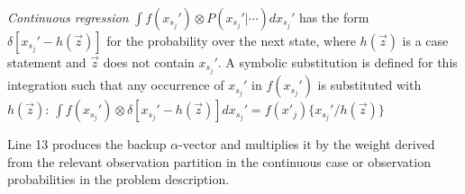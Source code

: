 \documentclass{article} %
\begin{document}
\emph{Continuous regression} $\int f(x_{s_j}') \otimes P(x_{s_j}'|\cdots) dx_{s_j}'$ has the form $\delta[x_{s_j}' - h(\vec{z})]$ for the probability over the next state, where $h(\vec{z})$ is a case statement and $\vec{z}$ does not contain
$x_{s_j}'$.  A symbolic substitution is defined for this integration such that any occurrence of $x_{s_j}'$ in $f(x_{s_j}')$ is substituted with $h(\vec{z})$: 
$\int f(x_{s_j}') \otimes \delta[x_{s_j}' - h(\vec{z})] dx_{s_j}' = f(x'_j) \{ x_{s_j}' / h(\vec{z}) \}$

Line 13 produces the backup $\alpha$-vector and multiplies it by the weight derived from the relevant observation partition in the continuous case or observation probabilities in the problem description. 
\end{document}
